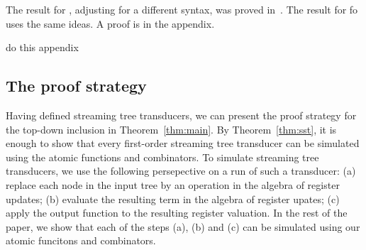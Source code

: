 The result for \mso, adjusting for a different syntax,  was proved in~\cite[Theorem 4.6]{alur2017streaming}. The result for fo uses the same ideas. A proof is in the appendix.
\begin{center}
    do this appendix 
\end{center}

\subsection{The proof strategy}
Having defined streaming tree transducers, we can present the proof strategy for the top-down inclusion in Theorem~\ref{thm:main}. By Theorem~\ref{thm:sst}, it is enough to show that every first-order streaming tree transducer can be simulated using the atomic functions and combinators. To simulate streaming tree transducers, we use the following persepective on a run of such a transducer: (a)  replace each node in the input tree by an operation in the algebra of register updates; (b) evaluate the resulting term in the algebra of register upates; (c) apply the output function to the resulting register valuation. In the rest of the paper, we show that each of the steps (a), (b) and (c) can be simulated using our atomic funcitons and combinators. 





